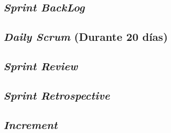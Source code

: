 \begin{spacing}{1.5}
	\subsection{\textit{Sprint BackLog}}
	\subsection{\textit{Daily Scrum} (Durante 20 d\'{i}as)}
	\subsection{\textit{Sprint Review}}
	\subsection{\textit{Sprint Retrospective}}
	
	\subsection{\textit{Increment}}
\end{spacing}